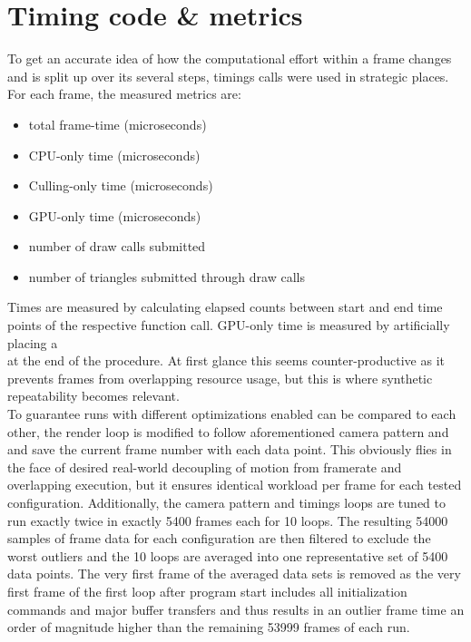 \section{Timing code \& metrics} \label{bmark_metrics}
To get an accurate idea of how the computational effort within a frame changes and is split up over its several steps,  timings calls were used in strategic places. For each frame, the measured metrics are: \begin{itemize}
\item total frame-time (microseconds)
\item CPU-only time (microseconds)
\item Culling-only time (microseconds)
\item GPU-only time (microseconds)
\item number of draw calls submitted
\item number of triangles submitted through draw calls
\end{itemize}
Times are measured by calculating elapsed counts between start and end time points of the respective function call. GPU-only time is measured by artificially placing a \\ at the end of the  procedure. At first glance this seems counter-productive as it prevents frames from overlapping resource usage, but this is where synthetic repeatability becomes relevant. \\
To guarantee runs with different optimizations enabled can be compared to each other, the render loop is modified to follow aforementioned camera pattern and and save the current frame number with each data point. This obviously flies in the face of desired real-world decoupling of motion from framerate and overlapping execution, but it ensures identical workload per frame for each tested configuration. Additionally, the camera pattern and timings loops are tuned to run exactly twice in exactly 5400 frames each for 10 loops. The resulting 54000 samples of frame data for each configuration are then filtered to exclude the worst outliers and the 10 loops are averaged into one representative set of 5400 data points. The very first frame of the averaged data sets is removed as the very first frame of the first loop after program start includes all initialization commands and major buffer transfers and thus results in an outlier frame time an order of magnitude higher than the remaining 53999 frames of each run. \\
